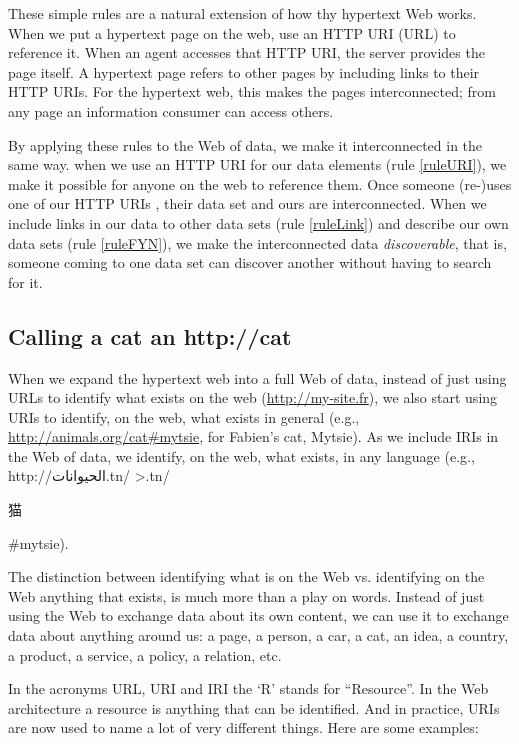 These simple rules are a natural extension of how thy hypertext Web works. When we put a hypertext page 
on the web, use an HTTP URI (URL) to reference it.  When an agent accesses that HTTP URI, the server provides 
the page itself.  A hypertext page refers to other pages by including links to their HTTP URIs. 
For the hypertext web, this makes the pages interconnected; from any page an 
information consumer can access others.

By applying these  rules to the Web of data, we make it interconnected in the same way.  
when we use an HTTP URI   for our data elements (rule \ref{ruleURI}), 
we make it possible for anyone on the web to reference them. Once someone
(re-)uses one of our HTTP URIs , their data set and ours
are interconnected.  When we include links in our data to 
other data sets (rule \ref{ruleLink}) and  describe our own 
data sets (rule \ref{ruleFYN}), we make 
the interconnected data \emph{discoverable}, that is, 
someone coming to one data set can discover another
without having to search for it. 


\hypertarget{calling-a-cat-an-httpcat}{%
\subsection{Calling a cat an
http://cat}\label{calling-a-cat-an-httpcat}}

When we expand the hypertext web into a full Web of data, instead of just using URLs to 
identify what exists on the web (\url{http://my-site.fr}), we also start using
URIs to identify, on the web, what exists in general
(e.g., \url{http://animals.org/cat\#mytsie}, for Fabien's cat, Mytsie).  As we include IRIs in the Web of data, we identify,
on the web, what exists, in any language
(e.g., http://\<الحيوانات.tn/ >.tn/\begin{CJK*}{UTF8}{gbsn}猫
\end{CJK*}\#mytsie).



The distinction between identifying what is on the Web vs. identifying
on the Web anything that exists, is much more than a play on words.
Instead of just using the Web to exchange data about its own content, we
can use it to exchange data about anything around us: a page, a person,
a car, a cat, an idea, a country, a product, a service, a policy, a
relation, etc.

In the acronyms URL, URI and IRI the `R' stands for ``Resource''. In the
Web architecture a resource is anything that can be identified. And in
practice, URIs are now used to name a lot of very different things. Here
are some examples:


